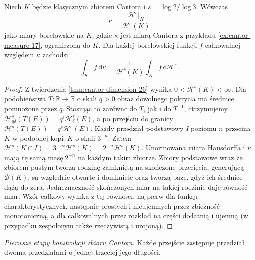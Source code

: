 \begin{wniosek}\label{it:cor:cantor-hausdorff}
Niech $K$ będzie klasycznym zbiorem Cantora i $s=\log2/\log3$. Wówczas
\[
 \kappa=\frac{\mathcal H^s|_K}{\mathcal H^s(K)}
\]
jako miary borelowskie na $K$, gdzie $\kappa$ jest miarą Cantora z przykładu \ref{ex:cantor-measure-17}, ograniczoną do $K$. Dla każdej borelowskiej funkcji $f$ całkowalnej względem $\kappa$ zachodzi
\[
 \int_K f\,\mathrm d\kappa
 =\frac{1}{\mathcal H^s(K)}\int_K f\,\mathrm d\mathcal H^s.
\]
\end{wniosek}
\begin{proof}
Z twierdzenia \ref{thm:cantor-dimension-26} wynika $0<\mathcal H^s(K)<\infty$. Dla podobieństwa $T:\mathbb{R}\to\mathbb{R}$ o skali $q>0$ obraz dowolnego pokrycia ma średnice pomnożone przez $q$. Stosując to zarówno do $T$, jak i do $T^{-1}$, otrzymujemy $\mathcal H^s_{q\delta}(T(E))=q^s\mathcal H^s_\delta(E)$, a po przejściu do granicy $\mathcal H^s(T(E))=q^s\mathcal H^s(E)$. Każdy przedział podstawowy $I$ poziomu $n$ przecina $K$ w podobnej kopii $K$ o skali $3^{-n}$. Zatem $\mathcal H^s(K\cap I)=3^{-ns}\mathcal H^s(K)=2^{-n}\mathcal H^s(K)$. Unormowana miara Hausdorffa i $\kappa$ mają tę samą masę $2^{-n}$ na każdym takim zbiorze. Zbiory podstawowe wraz ze zbiorem pustym tworzą rodzinę zamkniętą na skończone przecięcia, generującą $\mathcal B(K)$: są względnie otwarte i domknięte oraz tworzą bazę, gdyż ich średnice dążą do zera. Jednoznaczność skończonych miar na takiej rodzinie daje równość miar. Wzór całkowy wynika z tej równości, najpierw dla funkcji charakterystycznych, następnie prostych i nieujemnych przez zbieżność monotoniczną, a dla całkowalnych przez rozkład na części dodatnią i ujemną (w przypadku zespolonym także rzeczywistą i urojoną).
\end{proof}

\begin{center}
\end{center}
\noindent\textit{Pierwsze etapy konstrukcji zbioru Cantora.}
Każde przejście zastępuje przedział dwoma
przedziałami o jednej trzeciej jego długości.

